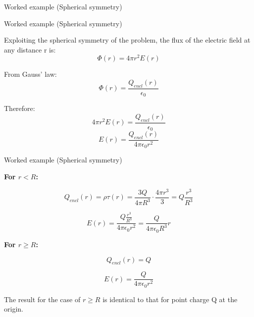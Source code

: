 {\begin{frame}{Worked example (Spherical symmetry)}
\end{frame}

%
%
%

\begin{frame}{Worked example (Spherical symmetry)}

  Exploiting the spherical symmetry of the problem,
  the flux of the electric field at any distance r is:
  \begin{equation*}
    \Phi(r) = 4\pi r^2 E(r)
  \end{equation*}

  From Gauss' law:
  \begin{equation*}
    \Phi(r) = \frac{Q_{encl}(r)}{\epsilon_0}
  \end{equation*}

  Therefore:
  \begin{equation*}
    4\pi r^2 E(r) = \frac{Q_{encl}(r)}{\epsilon_0}
  \end{equation*}
  \begin{equation*}
    E(r) = \frac{Q_{encl}(r)}{4 \pi \epsilon_0 r^2}
  \end{equation*}

\end{frame}

%
%
%

\begin{frame}{Worked example (Spherical symmetry)}

  {\bf For $r < R$:}

  \begin{equation*}
    Q_{encl}(r) =  \rho \tau(r) = \frac{3Q}{4\pi R^3} \cdot \frac{4\pi r^3}{3} = Q \frac{r^3}{R^3}
  \end{equation*}

  \begin{equation*}
    E(r) = \frac{Q \frac{r^3}{R^3}}{4 \pi \epsilon_0 r^2} = \frac{Q}{4 \pi \epsilon_0 R^3} r
  \end{equation*}

  {\bf For $r \ge R$:}

  \begin{equation*}
    Q_{encl}(r) =  Q
  \end{equation*}

  \begin{equation*}
    E(r) = \frac{Q}{4 \pi \epsilon_0 r^2}
  \end{equation*}

  The result for the case of $r \ge R$  is identical to that for point charge Q at the origin.

\end{frame}

} %

